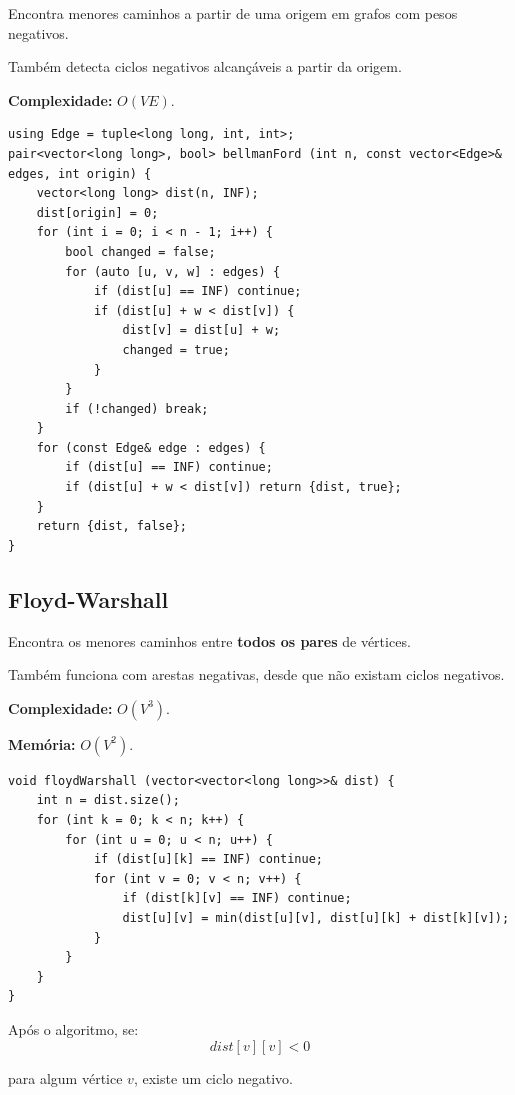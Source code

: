 Encontra menores caminhos a partir de uma origem em grafos com pesos negativos.

Também detecta ciclos negativos alcançáveis a partir da origem.

\textbf{Complexidade:} $O(VE)$.

\begin{lstlisting}
using Edge = tuple<long long, int, int>;
pair<vector<long long>, bool> bellmanFord (int n, const vector<Edge>& edges, int origin) {
    vector<long long> dist(n, INF);
    dist[origin] = 0;
    for (int i = 0; i < n - 1; i++) {
        bool changed = false;
        for (auto [u, v, w] : edges) {
            if (dist[u] == INF) continue;
            if (dist[u] + w < dist[v]) {
                dist[v] = dist[u] + w;
                changed = true;
            }
        }
        if (!changed) break;
    }
    for (const Edge& edge : edges) {
        if (dist[u] == INF) continue;
        if (dist[u] + w < dist[v]) return {dist, true};
    }
    return {dist, false};
}
\end{lstlisting}


\subsection{Floyd-Warshall}

Encontra os menores caminhos entre \textbf{todos os pares}
de vértices.

Também funciona com arestas negativas, desde que não existam
ciclos negativos.

\textbf{Complexidade:} $O(V^3)$.

\textbf{Memória:} $O(V^2)$.

\begin{lstlisting}
void floydWarshall (vector<vector<long long>>& dist) {
    int n = dist.size();
    for (int k = 0; k < n; k++) {
        for (int u = 0; u < n; u++) {
            if (dist[u][k] == INF) continue;
            for (int v = 0; v < n; v++) {
                if (dist[k][v] == INF) continue;
                dist[u][v] = min(dist[u][v], dist[u][k] + dist[k][v]);
            }
        }
    }
}
\end{lstlisting}

Após o algoritmo, se:
\[
dist[v][v] < 0
\]

para algum vértice $v$, existe um ciclo negativo.